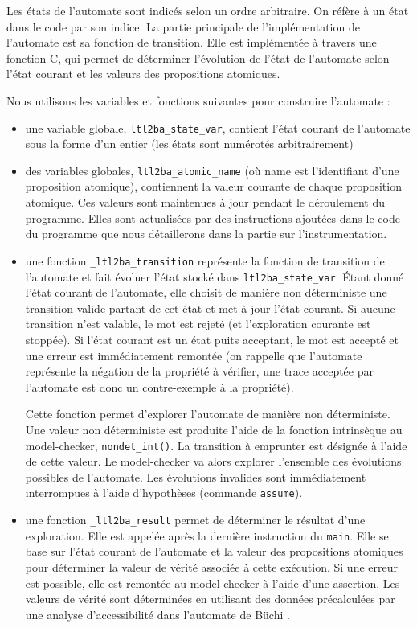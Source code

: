 Les états de l'automate sont indicés selon un ordre arbitraire. On réfère à un
état dans le code par son indice. La partie principale de l'implémentation de
l'automate est sa fonction de transition. Elle est implémentée à travers une
fonction C, qui permet de déterminer l'évolution de l'état de l'automate selon
l'état courant et les valeurs des propositions atomiques.

Nous utilisons les variables et fonctions suivantes pour construire l'automate :

\begin{itemize}
\item
  une variable globale, \texttt{ltl2ba\_state\_var}, contient l'état
  courant de l'automate sous la forme d'un entier (les états sont
  numérotés arbitrairement)
\item
  des variables globales, \texttt{ltl2ba\_atomic\_{name}} (où name est
  l'identifiant d'une proposition atomique), contiennent la valeur
  courante de chaque proposition atomique. Ces valeurs sont maintenues à
  jour pendant le déroulement du programme. Elles sont actualisées par
  des instructions ajoutées dans le code du programme que nous
  détaillerons dans la partie sur l'instrumentation.
\item
  une fonction \texttt{\_ltl2ba\_transition} représente la fonction de
  transition de l'automate et fait évoluer l'état stocké dans
  \texttt{ltl2ba\_state\_var}. Étant donné l'état courant de
  l'automate, elle choisit de manière non déterministe une transition
  valide partant de cet état et met à jour l'état courant. Si aucune
  transition n'est valable, le mot est rejeté (et l'exploration courante
  est stoppée). Si l'état courant est un état puits acceptant, le mot
  est accepté et une erreur est immédiatement remontée (on rappelle que
  l'automate représente la négation de la propriété à vérifier, une
  trace acceptée par l'automate est donc un contre-exemple à la
  propriété).

  Cette fonction permet d'explorer l'automate de manière
  non déterministe. Une valeur non déterministe est produite l'aide de
  la fonction intrinsèque au model-checker, \texttt{nondet\_int()}. La
  transition à emprunter est désignée à l'aide de cette valeur. Le
  model-checker va alors explorer l'ensemble des évolutions possibles de
  l'automate. Les évolutions invalides sont immédiatement interrompues à
  l'aide d'hypothèses (commande \texttt{assume}).
\item
  une fonction \texttt{\_ltl2ba\_result} permet de déterminer le
  résultat d'une exploration. Elle est appelée après la dernière
  instruction du \texttt{main}. Elle se base sur l'état courant de
  l'automate et la valeur des propositions atomiques pour déterminer la
  valeur de vérité associée à cette exécution. Si une erreur est
  possible, elle est remontée au model-checker à l'aide d'une assertion.
  Les valeurs de vérité sont déterminées en utilisant des données
  précalculées par une analyse d'accessibilité dans l'automate de Büchi
  \cite{morse_ltl}.
\end{itemize}

